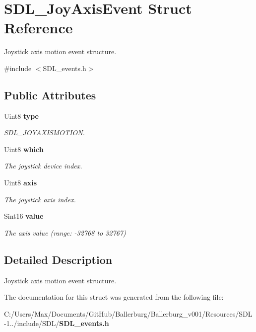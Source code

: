\section{S\+D\+L\+\_\+\+Joy\+Axis\+Event Struct Reference}
\label{struct_s_d_l___joy_axis_event}


Joystick axis motion event structure.  




{\ttfamily \#include $<$S\+D\+L\+\_\+events.\+h$>$}

\subsection*{Public Attributes}
\begin{DoxyCompactItemize}
\item 
Uint8 {\bf type}\label{struct_s_d_l___joy_axis_event_ab49b38845a4326b1591f7c8fadc6e5ad}

\begin{DoxyCompactList}\small\item\em S\+D\+L\+\_\+\+J\+O\+Y\+A\+X\+I\+S\+M\+O\+T\+I\+O\+N. \end{DoxyCompactList}\item 
Uint8 {\bf which}\label{struct_s_d_l___joy_axis_event_a41a7483a5520986f340808da16e08775}

\begin{DoxyCompactList}\small\item\em The joystick device index. \end{DoxyCompactList}\item 
Uint8 {\bf axis}\label{struct_s_d_l___joy_axis_event_a0beac2fb161e45771c424bd0b6daeabb}

\begin{DoxyCompactList}\small\item\em The joystick axis index. \end{DoxyCompactList}\item 
Sint16 {\bf value}\label{struct_s_d_l___joy_axis_event_a53ee73e7c367934dd6edb69963be5556}

\begin{DoxyCompactList}\small\item\em The axis value (range\+: -\/32768 to 32767) \end{DoxyCompactList}\end{DoxyCompactItemize}


\subsection{Detailed Description}
Joystick axis motion event structure. 

The documentation for this struct was generated from the following file\+:\begin{DoxyCompactItemize}
\item 
C\+:/\+Users/\+Max/\+Documents/\+Git\+Hub/\+Ballerburg/\+Ballerburg\+\_\+v001/\+Resources/\+S\+D\+L-\/1../include/\+S\+D\+L/{\bf S\+D\+L\+\_\+events.\+h}\end{DoxyCompactItemize}
